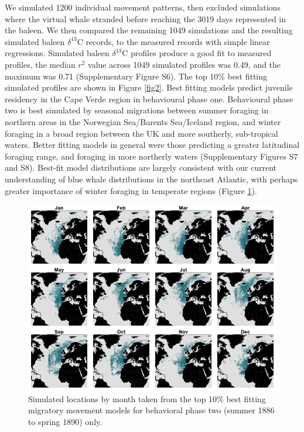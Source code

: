 \documentclass[a4paper,12pt]{article}
\begin{document}
We simulated 1200 individual movement patterns, then excluded simulations where the virtual whale stranded before reaching the 3019 days represented in the baleen.
We then compared the remaining 1049 simulations and the resulting simulated baleen $\delta^{13}$C records, to the measured records with simple linear regressions. 
Simulated baleen $\delta^{13}$C profiles produce a good fit to measured profiles, the median $r^2$ value across 1049 simulated profiles was 0.49, and the maximum was 0.71 (Supplementary Figure S6).
The top 10\% best fitting simulated profiles are shown in Figure \ref{fig2}. 
Best fitting models predict juvenile residency in the Cape Verde region in behavioural phase one. 
Behavioural phase two is best simulated by seasonal migrations between summer foraging in northern areas in the Norwegian Sea/Barents Sea/Iceland region, and winter foraging in a broad region between the UK and more southerly, sub-tropical waters. 
Better fitting models in general were those predicting a greater latitudinal foraging range, and foraging in more northerly waters (Supplementary Figures S7 and S8).
Best-fit model distributions are largely consistent with our current understanding of blue whale distributions in the northeast Atlantic\cite{reeves2004historical,baines2014upwellings,baines2017autumn,reeves2004historical}, with perhaps greater importance of winter foraging in temperate regions (Figure \ref{fig4}).

\begin{figure}
 \centering
  \includegraphics[width = \linewidth]{figures/Figure-4-monthly.png}
  \caption{Simulated locations by month taken from the top 10\% best fitting migratory movement models for behavioral phase two (summer 1886 to spring 1890) only.}
  \label{fig4}
\end{figure}
\end{document}
